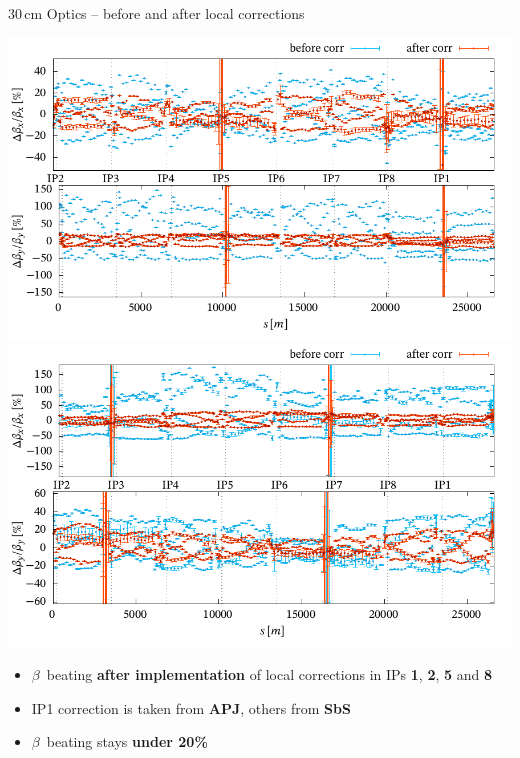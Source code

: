 \documentclass[4pt,usenames,dvipsnames,aspectratio=169,table]{beamer}
\newcommand{\highl}[1]{\textbf{#1}}
\begin{document}
\begin{frame}{30\,cm Optics -- before and after local corrections}

    \begin{center}
    \includegraphics[width=0.49\linewidth]{images/squeeze/b1_bb_comp.pdf}
    \hfill
    \includegraphics[width=0.49\linewidth]{images/squeeze/b2_bb_comp.pdf}
    \end{center}
    
    \begin{itemize}
        \item $\beta$~beating \highl{after implementation} of local corrections in IPs \textbf{1}, \textbf{2}, \textbf{5} and \textbf{8}
        \item IP1 correction is taken from \highl{APJ}, others from \highl{SbS}
        \item $\beta$~beating stays \highl{under 20\%}
    \end{itemize}
    
\end{frame}
\end{document}
